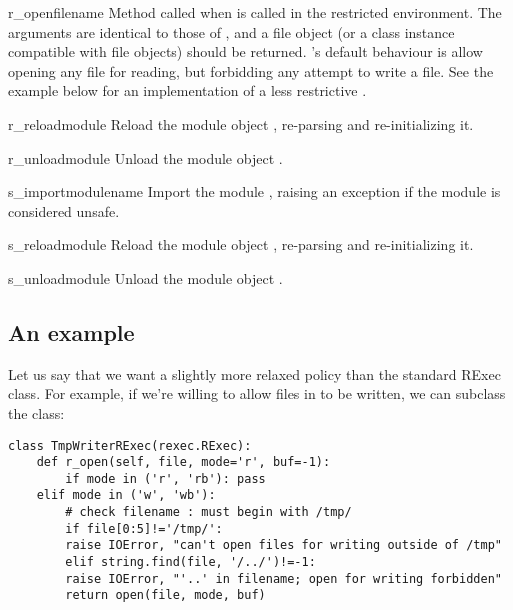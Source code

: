 \begin{funcdesc}{r_open}{filename}
Method called when  is called in the restricted
environment.  The arguments are identical to those of ,
and a file object (or a class instance compatible with file objects)
should be returned.  's default behaviour is allow opening
any file for reading, but forbidding any attempt to write a file.  See
the example below for an implementation of a less restrictive .
\end{funcdesc}

\begin{funcdesc}{r_reload}{module}
Reload the module object , re-parsing and re-initializing it.  
\end{funcdesc}

\begin{funcdesc}{r_unload}{module}
Unload the module object .   
\end{funcdesc}

\begin{funcdesc}{s_import}{modulename}
Import the module , raising an  exception
if the module is considered unsafe.  
\end{funcdesc}

\begin{funcdesc}{s_reload}{module}
Reload the module object , re-parsing and re-initializing it.  
\end{funcdesc}

\begin{funcdesc}{s_unload}{module}
Unload the module object .   
\end{funcdesc}

\subsection{An example}

Let us say that we want a slightly more relaxed policy than the
standard RExec class.  For example, if we're willing to allow files in
 to be written, we can subclass the  class:

\bcode\begin{verbatim}
class TmpWriterRExec(rexec.RExec):
    def r_open(self, file, mode='r', buf=-1):
        if mode in ('r', 'rb'): pass 
	elif mode in ('w', 'wb'):
	    # check filename : must begin with /tmp/
	    if file[0:5]!='/tmp/': 
		raise IOError, "can't open files for writing outside of /tmp"
	    elif string.find(file, '/../')!=-1:
		raise IOError, "'..' in filename; open for writing forbidden"
        return open(file, mode, buf)
\end{verbatim}\ecode

